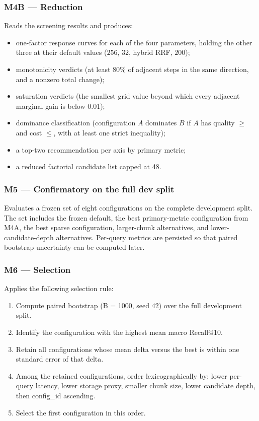 \documentclass[11pt,a4paper]{article}
\begin{document}
\subsubsection{M4B --- Reduction}
Reads the screening results and produces:

\begin{itemize}[leftmargin=1.5em,itemsep=0.15em]
  \item one-factor response curves for each of the four parameters,
    holding the other three at their default values
    ($256$, $32$, hybrid RRF, $200$);
  \item monotonicity verdicts (at least \num{80}\% of adjacent
    steps in the same direction, and a nonzero total change);
  \item saturation verdicts (the smallest grid value beyond which
    every adjacent marginal gain is below \num{0.01});
  \item dominance classification (configuration $A$ dominates $B$
    if $A$ has quality $\geq$ and cost $\leq$, with at least one
    strict inequality);
  \item a top-two recommendation per axis by primary metric;
  \item a reduced factorial candidate list capped at \num{48}.
\end{itemize}

\subsubsection{M5 --- Confirmatory on the full dev split}
Evaluates a frozen set of eight configurations on the complete
development split. The set includes the frozen default, the best
primary-metric configuration from M4A, the best sparse
configuration, larger-chunk alternatives, and lower-candidate-depth
alternatives. Per-query metrics are persisted so that paired
bootstrap uncertainty can be computed later.

\subsubsection{M6 --- Selection}
Applies the following selection rule:

\begin{enumerate}[leftmargin=1.5em,itemsep=0.15em]
  \item Compute paired bootstrap (B = \num{1000}, seed \num{42})
    over the full development split.
  \item Identify the configuration with the highest mean macro
    Recall@10.
  \item Retain all configurations whose mean delta versus the best
    is within one standard error of that delta.
  \item Among the retained configurations, order
    lexicographically by: lower per-query latency, lower storage
    proxy, smaller chunk size, lower candidate depth, then
    config\_id ascending.
  \item Select the first configuration in this order.
\end{enumerate}
\end{document}
